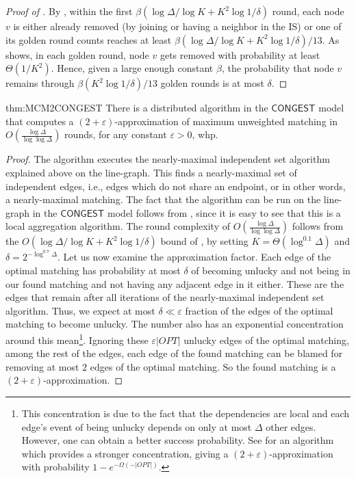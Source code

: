 \documentclass[11pt]{article}
\newcommand{\eps}{\varepsilon}
\newenvironment{theorem-repeat}[1]{\begin{trivlist}
\item[\hspace{\labelsep}{\bf\noindent Theorem \ref{#1} }]\em }%
{\end{trivlist}}
\begin{document}
\begin{proof}[Proof of ]
By , within the first $\beta(\log \Delta/\log K + K^2 \log 1/\delta)$ round, each node $v$ is either already removed (by joining or having a neighbor in the IS) or one of its golden round counts reaches at least $\beta(\log \Delta/\log K + K^2 \log 1/\delta)/13$. As  shows, in each golden round, node $v$ gets removed with probability at least $\Theta(1/K^2)$. Hence, given a large enough constant $\beta$, the probability that node $v$ remains through $\beta(K^2 \log 1/\delta)/13$ golden rounds is at most $\delta$.
\end{proof}

\begin{theorem-repeat}{thm:MCM2CONGEST} There is a distributed algorithm in the $\mathsf{CONGEST}$ model that computes a $(2+\eps)$-approximation of maximum unweighted matching in $O(\frac{\log\Delta} {\log\log \Delta})$ rounds, for any constant $\eps>0$, whp.
\end{theorem-repeat}
\begin{proof} The algorithm executes the nearly-maximal independent set algorithm explained above on the line-graph. This finds a nearly-maximal set of independent edges, i.e., edges which do not share an endpoint, or in other words, a nearly-maximal matching. The fact that the algorithm can be run on the line-graph in the $\mathsf{CONGEST}$ model follows from , since it is easy to see that this is a local aggregation algorithm. The round complexity of $O(\frac{\log\Delta} {\log\log \Delta})$ follows from the $O(\log \Delta/\log K + K^2 \log 1/\delta)$ bound of , by setting $K=\Theta(\log^{0.1} \Delta)$ and $\delta = 2^{-\log^{0.7} \Delta}$. Let us now examine the approximation factor. Each edge of the optimal matching has probability at most $\delta$ of becoming unlucky and not being in our found matching and not having any adjacent edge in it either. These are the edges that remain after all iterations of the nearly-maximal independent set algorithm. Thus, we expect at most $\delta \ll \eps$ fraction of the edges of the optimal matching to become unlucky. The number also has an exponential concentration around this mean\footnote{This concentration is due to the fact that the dependencies are local and each edge's event of being unlucky depends on only at most $\Delta$ other edges. However, one can obtain a better success probability. See  for an algorithm which provides a stronger concentration, giving a $(2+\eps)$-approximation with probability $1-e^{-\Omega(-|OPT|)}$.}. Ignoring these $\eps|OPT|$ unlucky edges of the optimal matching, among the rest of the edges, each edge of the found matching can be blamed for removing at most $2$ edges of the optimal matching. So the found matching is a $(2+\eps)$-approximation.
\end{proof}
\end{document}
